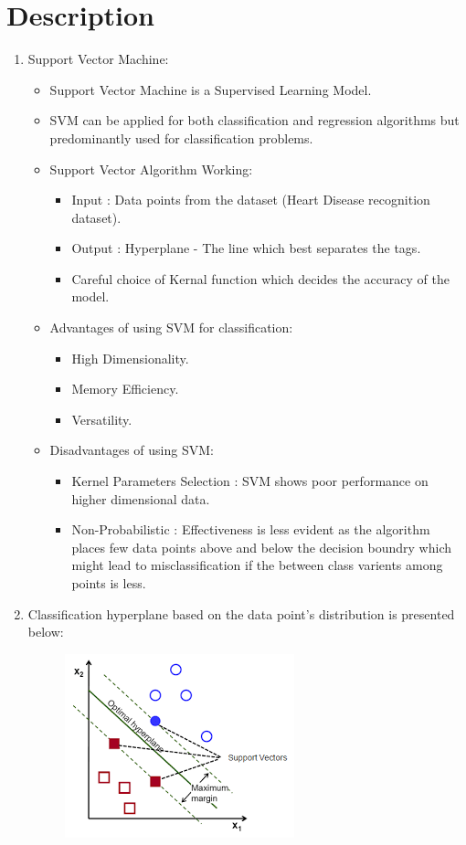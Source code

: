 \documentclass[a4paper,10pt]{article}
\begin{document}
\section{Description}
\begin{enumerate}
	\item Support Vector Machine:
	\begin{itemize}
		\item Support Vector Machine is a Supervised Learning Model.
		\item SVM can be applied for both classification and regression algorithms but predominantly used for classification problems.	 
		\item Support Vector Algorithm Working:
		\begin{itemize}
		 \item Input : Data points from the dataset (Heart Disease recognition dataset).
		 \item Output : Hyperplane - The line which best separates the tags.
		 \item Careful choice of Kernal function which decides the accuracy of the model.	
		\end{itemize}
	    \item Advantages of using SVM for classification:
	    \begin{itemize}
	    	\item High Dimensionality.
	    	\item Memory Efficiency.
	    	\item Versatility.	
	    \end{itemize}
       \item Disadvantages of using SVM:
       \begin{itemize}
       	\item Kernel Parameters Selection : SVM shows poor performance on higher dimensional data.
       	\item Non-Probabilistic : Effectiveness is less evident as the algorithm places few data points above and below the decision boundry which might lead to misclassification if the between class varients among points is less.
       \end{itemize}	
	\end{itemize}
    \item Classification hyperplane based on the data point's distribution is presented below:
     \begin{figure}[h]
    	\includegraphics[scale=0.70,center]{svmClassification.png}

\end{figure}
\end{enumerate}
\end{document}
